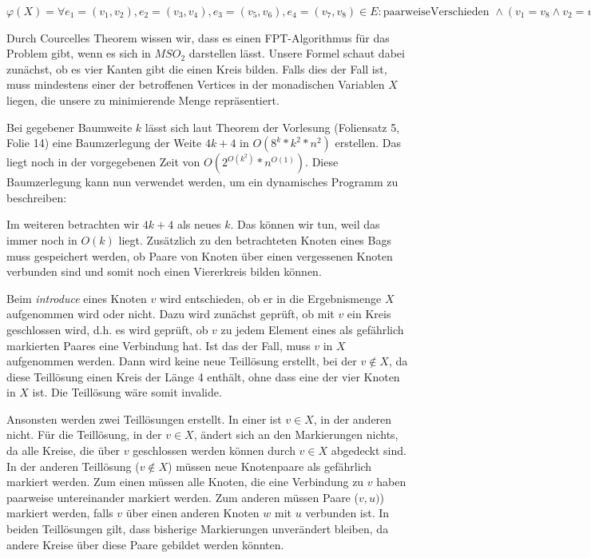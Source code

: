 

\DeclareMathOperator{\vc}{vc}





\subexercise

$\varphi(X) = \forall e_1 = (v_1, v_2), e_2 = (v_3, v_4), e_3 = (v_5, v_6), e_4 = (v_7, v_8) \in E \colon \text{paarweiseVerschieden } \wedge (v_1 = v_8 \wedge v_2 = v_3 \wedge v_4 = v_5 \wedge v_6 = v_7) \rightarrow (v_1, \dots, v_8) \cap X \neq \emptyset$

\how

Durch Courcelles Theorem wissen wir, dass es einen FPT-Algorithmus für das Problem gibt, wenn es sich in $MSO_2$ darstellen lässt. Unsere Formel schaut dabei zunächst, ob es vier Kanten gibt die einen Kreis bilden. Falls dies der Fall ist, muss mindestens einer der betroffenen Vertices in der monadischen Variablen $X$ liegen, die unsere zu minimierende Menge repräsentiert. 

\subexercise

Bei gegebener Baumweite $k$ lässt sich laut Theorem der Vorlesung (Foliensatz 5, Folie 14) eine Baumzerlegung der Weite $4k+4$ in $O(8^k*k^2*n^2)$ erstellen. Das liegt noch in der vorgegebenen Zeit von $O(2^{O(k^2)}*n^{O(1)})$. Diese Baumzerlegung kann nun verwendet werden, um ein dynamisches Programm zu beschreiben:

Im weiteren betrachten wir $4k+4$ als neues $k$. Das können wir tun, weil das immer noch in $O(k)$ liegt. Zusätzlich zu den betrachteten Knoten eines Bags muss gespeichert werden, ob Paare von Knoten über einen vergessenen Knoten verbunden sind und somit noch einen Viererkreis bilden können.

Beim \textit{introduce} eines Knoten $v$ wird entschieden, ob er in die Ergebnismenge $X$ aufgenommen wird oder nicht. Dazu wird zunächst geprüft, ob mit $v$ ein Kreis geschlossen wird, d.h. es wird geprüft, ob $v$ zu jedem Element eines als gefährlich markierten Paares eine Verbindung hat. Ist das der Fall, muss $v$ in $X$ aufgenommen werden. Dann wird keine neue Teillösung erstellt, bei der $v \notin X$, da diese Teillösung einen Kreis der Länge 4 enthält, ohne dass eine der vier Knoten in $X$ ist. Die Teillösung wäre somit invalide. 

Ansonsten werden zwei Teillösungen erstellt. In einer ist $v\in X$, in der anderen nicht. Für die Teillösung, in der $v\in X$, ändert sich an den Markierungen nichts, da alle Kreise, die über $v$ geschlossen werden können durch $v\in X$ abgedeckt sind. In der anderen Teillösung ($v\notin X$) müssen neue Knotenpaare als gefährlich markiert werden. Zum einen müssen alle Knoten, die eine Verbindung zu $v$ haben paarweise untereinander markiert werden. Zum anderen müssen Paare ($v,u)$) markiert werden, falls $v$ über einen anderen Knoten $w$ mit $u$ verbunden ist. In beiden Teillösungen gilt, dass bisherige Markierungen unverändert bleiben, da andere Kreise über diese Paare gebildet werden könnten.

